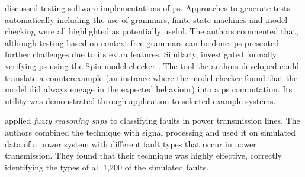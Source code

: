 \citeauthor{Gheorghe2010} \cite{Gheorghe2010} discussed testing software implementations of \gls{ps}.  Approaches to generate tests automatically including the use of grammars, finite state machines and model checking were all highlighted as potentially useful.  The authors commented that, although testing based on context-free grammars can be done, \gls{ps} presented further challenges due to its extra features.  Similarly, \citeauthor{Lefticaru2011} \cite{Lefticaru2011} investigated formally verifying \gls{ps} using the Spin model checker \cite{Ben-Ari2008}.  The tool the authors developed could translate a counterexample (an instance where the model checker found that the model did always engage in the expected behaviour) into a \gls{ps} computation.  Its utility was demonstrated through application to selected example systems.

\citeauthor{Huang2016} \cite{Huang2016} applied \emph{fuzzy reasoning \gls{snps}} to classifying faults in power transmission lines.  The authors combined the technique with signal processing and used it on simulated data of a power system with different fault types that occur in power transmission.  They found that their technique was highly effective, correctly identifying the types of all 1,200 of the simulated faults.



